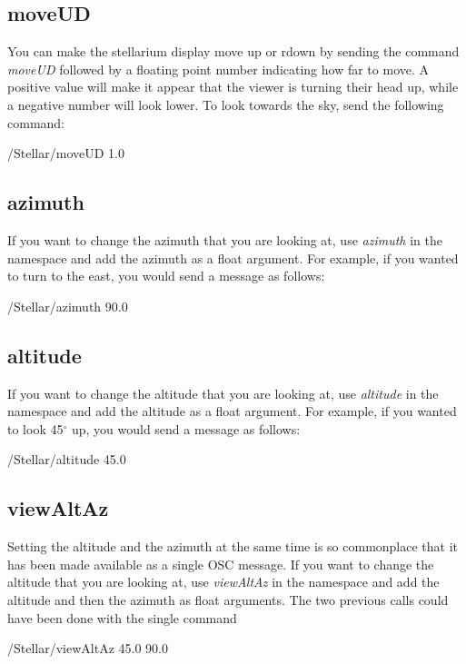 \subsection{moveUD} 
You can make the stellarium display move up or rdown by sending the command \textit{moveUD} followed by a floating point number indicating how far to move. A positive value will make it appear that the viewer is turning their head up, while a negative number will look lower. To look towards the sky, send the following command:
\begin{syntax}	
	\medskip
	/Stellar/moveUD 1.0
	\medskip
\end{syntax}
\bigskip

\subsection{azimuth}  \label{subsec:azimuth}
If you want to change the azimuth that you are looking at, use \textit{azimuth} in the namespace and add the azimuth as a float argument. For example, if you wanted to turn to the east, you would send a message as follows:
 \begin{syntax}	
	\medskip
	/Stellar/azimuth 90.0
	\medskip
\end{syntax}

\subsection{altitude} 
If you want to change the altitude that you are looking at, use \textit{altitude} in the namespace and add the altitude as a float argument. For example, if you wanted to look 45$^{\circ}$ up, you would send a message as follows:
\begin{syntax}	
	\medskip
	/Stellar/altitude 45.0
	\medskip
\end{syntax}

\subsection{viewAltAz} 
Setting the altitude and the azimuth at the same time is so commonplace that it has been made available as a single OSC message.
If you want to change the altitude that you are looking at, use \textit{viewAltAz} in the namespace and add the altitude and then the azimuth as float arguments. The two previous calls could have been done with the single command
\begin{syntax}	
	\medskip
	/Stellar/viewAltAz 45.0 90.0
	\medskip
\end{syntax}

